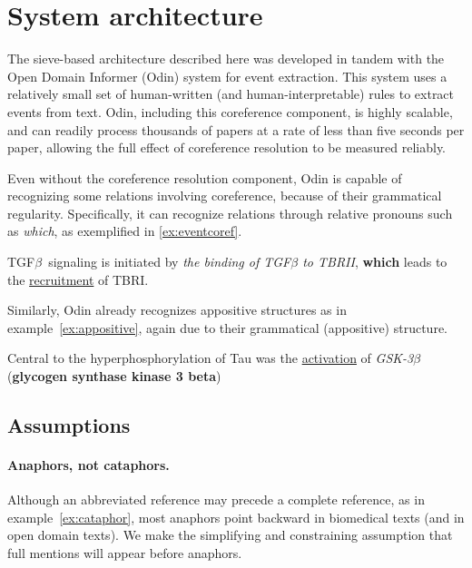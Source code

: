 \section{System architecture}

The sieve-based architecture described here was developed in tandem with the Open Domain Informer (Odin) system \cite{valenzuela2015odin} for event extraction. This system uses a relatively small set of human-written (and human-interpretable) rules to extract events from text. Odin, including this coreference component, is highly scalable, and can readily process thousands of papers at a rate of less than five seconds per paper, allowing the full effect of coreference resolution to be measured reliably.

Even without the coreference resolution component, Odin is capable of recognizing some relations involving coreference, because of their grammatical regularity. Specifically, it can recognize relations through relative pronouns such as {\it which}, %
as exemplified in \ref{ex:eventcoref}.

\begin{exe}
	\ex\label{ex:eventcoref} TGF$\beta$\ signaling is initiated by {\it the binding of TGF$\beta$ to TBRII}, {\bf which} 
leads to the \underline{recruitment} of TBRI.
\end{exe}

Similarly, Odin already recognizes appositive structures as in example~\ref{ex:appositive}, again due to their grammatical (appositive) structure.

\begin{exe}
	\ex\label{ex:appositive} Central to the hyperphosphorylation of Tau was the \underline{activation} of {\it GSK-3$\beta$} ({\bf glycogen synthase kinase 3 beta})\textellipsis
\end{exe}

\subsection{Assumptions}

\paragraph{Anaphors, not cataphors.} 

Although an abbreviated reference may precede a complete reference, as in example~\ref{ex:cataphor}, most anaphors point backward in biomedical texts (and in open domain texts). We make the simplifying and constraining assumption that full mentions will appear before anaphors.

